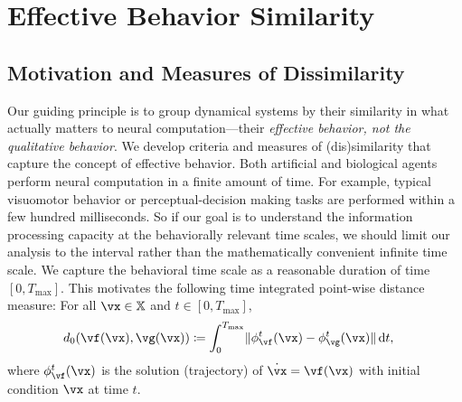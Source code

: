 \documentclass{article}
\theoremstyle{definition} \newtheorem{definition}{Definition}  \newtheorem{example}{Example}
\theoremstyle{remark} \newtheorem{remark}{Remark}
\newcounter{ct}
\DeclarePairedDelimiter{\norm}{\lVert}{\rVert}
\newcommand{\dm}[1]{\ensuremath{\mathrm{d}{#1}}} %
\newcommand{\inputSpace}{\mathbb{X}}
\begin{document}
\section{Effective Behavior Similarity}\label{sec:effective_ds}
\subsection{Motivation and Measures of Dissimilarity}
Our guiding principle is to group dynamical systems by their similarity in what actually matters to neural computation---their \emph{effective behavior, not the qualitative behavior}.
We develop criteria and measures of (dis)similarity that capture the concept of effective behavior.
Both artificial and biological agents perform neural computation in a finite amount of time.
For example, typical visuomotor behavior or perceptual-decision making tasks are performed within a few hundred milliseconds.
So if our goal is to understand the information processing capacity at the behaviorally relevant time scales, we should limit our analysis to the interval rather than the mathematically convenient infinite time scale.
We capture the behavioral time scale as a reasonable duration of time $[0, T_\text{max}]$.
%
This motivates the following time integrated point-wise distance measure:
For all $\vx \in \inputSpace$ and $t \in [0, T_\text{max}]$,
\begin{align}
    d_0(\vf(\vx), \vg(\vx))
	&\coloneq \int_0^{T_{\text{max}}} \norm{\phi_\vf^t(\vx) - \phi_\vg^t(\vx)}\, \dm{t},
\end{align}
where $\phi_\vf^t(\vx)$ is the solution (trajectory) of $\dot\vx = \vf(\vx)$ with initial condition $\vx$ at time $t$.
\end{document}
